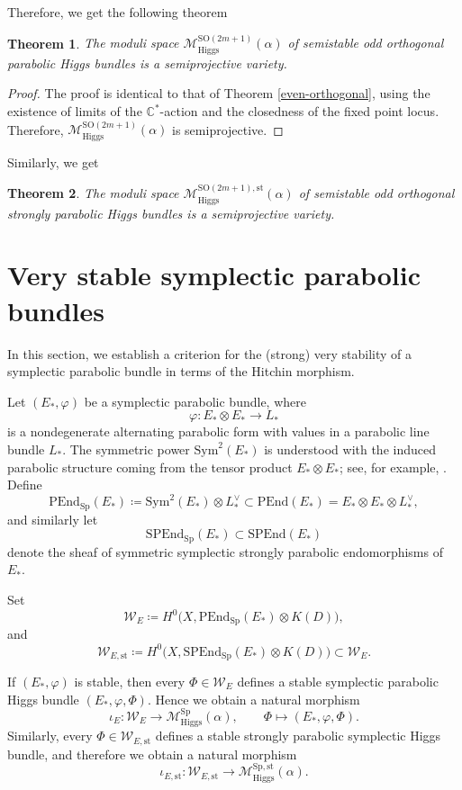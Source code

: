 \documentclass[11pt, reqno]{amsart}
\numberwithin{equation}{section}
\newcommand{\Sp}{\mathrm{Sp}}
\newcommand{\Higgs}{\mathrm{Higgs}}
\newtheorem{theorem}{Theorem}[section]
\theoremstyle{definition}
\begin{document}
Therefore, we get the following theorem
\begin{theorem}\label{odd-orthogonal}
    The moduli space $\mathcal{M}^{\mathrm{SO}(2m+1)}_{\mathrm{Higgs}}(\alpha)$ of semistable odd orthogonal parabolic Higgs bundles is a semiprojective variety.
\end{theorem}
\begin{proof}
    The proof is identical to that of Theorem \ref{even-orthogonal}, using the existence of limits of the $\mathbb{C}^*$-action and the closedness of the fixed point locus. Therefore, $\mathcal{M}^{\mathrm{SO}(2m+1)}_{\mathrm{Higgs}}(\alpha)$ is semiprojective.
\end{proof}

Similarly, we get
\begin{theorem}
        The moduli space $\mathcal{M}^{\mathrm{SO}(2m+1),\mathrm{st}}_{\mathrm{Higgs}}(\alpha)$ of semistable odd orthogonal strongly parabolic Higgs bundles is a semiprojective variety.
\end{theorem}

\section{Very stable symplectic parabolic bundles}

In this section, we establish a criterion for the (strong) very stability of a symplectic parabolic bundle in terms of the Hitchin morphism.

Let $(E_*,\varphi)$ be a symplectic parabolic bundle, where
\[
\varphi : E_* \otimes E_* \longrightarrow L_*
\]
is a nondegenerate alternating parabolic form with values in a parabolic line bundle $L_*$. The symmetric power $\mathrm{Sym}^2(E_*)$ is understood with the induced parabolic structure coming from the tensor product $E_* \otimes E_*$; see, for example, \cite{MY92,Y93}. Define
\[
\mathrm{PEnd}_{\mathrm{Sp}}(E_*) \coloneqq \mathrm{Sym}^2(E_*) \otimes L_*^\vee \subset \mathrm{PEnd}(E_*)=E_* \otimes E_* \otimes L_*^\vee,
\]
and similarly let
\[
\mathrm{SPEnd}_{\mathrm{Sp}}(E_*) \subset \mathrm{SPEnd}(E_*)
\]
denote the sheaf of symmetric symplectic strongly parabolic endomorphisms of $E_*$.

Set
\[
\mathcal{W}_E \coloneqq H^0\bigl(X,\mathrm{PEnd}_{\mathrm{Sp}}(E_*) \otimes K(D)\bigr),
\]
and
\[
\mathcal{W}_{E,\mathrm{st}} \coloneqq H^0\bigl(X,\mathrm{SPEnd}_{\mathrm{Sp}}(E_*) \otimes K(D)\bigr)\subset \mathcal{W}_E.
\]

If $(E_*,\varphi)$ is stable, then every $\Phi \in \mathcal{W}_E$ defines a stable symplectic parabolic Higgs bundle $(E_*,\varphi,\Phi)$. Hence we obtain a natural morphism
\[
\iota_E : \mathcal{W}_E \longrightarrow \mathcal{M}^{\Sp}_{\Higgs}(\alpha),
\qquad
\Phi \longmapsto (E_*,\varphi,\Phi).
\]
Similarly, every $\Phi \in \mathcal{W}_{E,\mathrm{st}}$ defines a stable strongly parabolic symplectic Higgs bundle, and therefore we obtain a natural morphism
\[
\iota_{E,\mathrm{st}} : \mathcal{W}_{E,\mathrm{st}} \longrightarrow \mathcal{M}^{\Sp,\mathrm{st}}_{\Higgs}(\alpha).
\]
\end{document}
